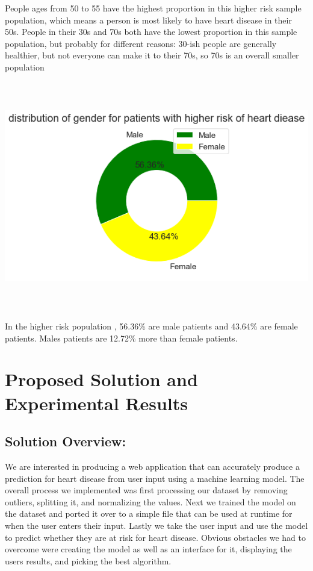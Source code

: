 \documentclass[12pt]{article}
\begin{document}
People ages from 50 to 55 have the highest proportion in this higher risk sample population, which means a person is most likely to have heart disease in their 50s. People in their 30s and 70s both have the lowest proportion in this sample population, but probably for different reasons: 30-ish people are generally healthier, but not everyone can make it to their 70s, so 70s is an overall smaller population 
\begin{center}
    \includegraphics[width=\textwidth, height=10cm, keepaspectratio]{images/image1.png}    
\end{center}
In the higher risk population , 56.36\%  are male patients and  43.64\% are female patients. Males patients are 12.72\% more than female patients. 

\section*{Proposed Solution and Experimental Results}
\subsection*{Solution Overview:}
We are interested in producing a web application that can accurately produce a prediction for heart disease from user input using a machine learning model. The overall process we implemented was first processing our dataset by removing outliers, splitting it, and normalizing the values. Next we trained the model on the dataset and ported it over to a simple file that can be used at runtime for when the user enters their input. Lastly we take the user input and use the model to predict whether they are at risk for heart disease. Obvious obstacles we had to overcome were creating the model as well as an interface for it, displaying the users results, and picking the best algorithm. 
\end{document}
